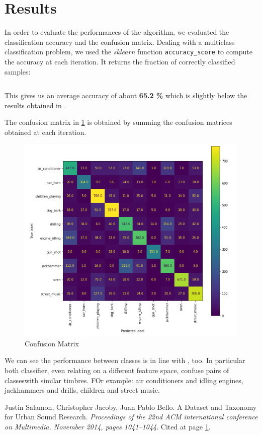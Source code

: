 \documentclass[letterpaper, 12pt]{article}
\begin{document}
	\section{Results}
	In order to evaluate the performances of the algorithm, we evaluated the classification accuracy and the confusion matrix. 
Dealing with a multiclass classification problem, we used the \textit{sklearn} function \texttt{accuracy\_score} to compute the accuracy at each iteration. It returns the fraction of correctly classified samples:

\begin{equation}
[0.630, 0.646, 0.6086486486486486, 0.606, 0.703, 0.579, 0.663, 0.700, 0.680, 0.708]
\end{equation}
	
	 This gives us an average accuracy of about \textbf{ 65.2 \% } which is slightly below the results obtained in \cite{sal14}.
	
	The confusion matrix in \ref{fig:cm} is obtained by summing the confusion matrices obtained at each iteration.
	

\begin{figure}
  \includegraphics[width=\linewidth]{cm.png}
  \caption{Confusion Matrix}
  \label{fig:cm}
\end{figure}
	
We can see the performance between classes is in line with \cite{sal14}, too.
In particular both classifier, even relating on a different feature space, confuse pairs of classeswith similar timbres. FOr example: air conditioners and idling engines, jackhammers and drills, children and street music.
	
	
	\begin{thebibliography}{99}
		
		Justin Salamon, Christopher Jacoby, Juan Pablo Bello. A Dataset and Taxonomy for Urban Sound Research. \textit{Proceedings of the 22nd ACM international conference on Multimedia. November 2014, pages 1041–1044}. Cited at page \hyperlink{page.1}{1}.
		
		
	\end{thebibliography}

	
	
\end{document}
